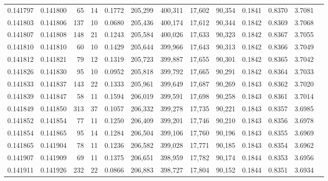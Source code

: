 \begin{tabular}{rrrrrrrrrrrrr}
0.141797 & 0.141800 &    65 &  14 &                                     0.1772 & 205,299 & 400,311 &  17,602 &  90,354 & 0.1841 & 0.8370 & 3.7081 \\
0.141803 & 0.141806 &   137 &  10 &                                     0.0680 & 205,436 & 400,174 &  17,612 &  90,344 & 0.1842 & 0.8369 & 3.7068 \\
0.141807 & 0.141808 &   148 &  21 &                                     0.1243 & 205,584 & 400,026 &  17,633 &  90,323 & 0.1842 & 0.8367 & 3.7055 \\
0.141810 & 0.141810 &    60 &  10 &                                     0.1429 & 205,644 & 399,966 &  17,643 &  90,313 & 0.1842 & 0.8366 & 3.7049 \\
0.141812 & 0.141821 &    79 &  12 &                                     0.1319 & 205,723 & 399,887 &  17,655 &  90,301 & 0.1842 & 0.8365 & 3.7042 \\
0.141826 & 0.141830 &    95 &  10 &                                     0.0952 & 205,818 & 399,792 &  17,665 &  90,291 & 0.1842 & 0.8364 & 3.7033 \\
0.141833 & 0.141837 &   143 &  22 &                                     0.1333 & 205,961 & 399,649 &  17,687 &  90,269 & 0.1843 & 0.8362 & 3.7020 \\
0.141839 & 0.141847 &    58 &  11 &                                     0.1594 & 206,019 & 399,591 &  17,698 &  90,258 & 0.1843 & 0.8361 & 3.7014 \\
0.141849 & 0.141850 &   313 &  37 &                                     0.1057 & 206,332 & 399,278 &  17,735 &  90,221 & 0.1843 & 0.8357 & 3.6985 \\
0.141852 & 0.141854 &    77 &  11 &                                     0.1250 & 206,409 & 399,201 &  17,746 &  90,210 & 0.1843 & 0.8356 & 3.6978 \\
0.141854 & 0.141865 &    95 &  14 &                                     0.1284 & 206,504 & 399,106 &  17,760 &  90,196 & 0.1843 & 0.8355 & 3.6969 \\
0.141865 & 0.141904 &    78 &  11 &                                     0.1236 & 206,582 & 399,028 &  17,771 &  90,185 & 0.1843 & 0.8354 & 3.6962 \\
0.141907 & 0.141909 &    69 &  11 &                                     0.1375 & 206,651 & 398,959 &  17,782 &  90,174 & 0.1844 & 0.8353 & 3.6956 \\
0.141911 & 0.141926 &   232 &  22 &                                     0.0866 & 206,883 & 398,727 &  17,804 &  90,152 & 0.1844 & 0.8351 & 3.6934 \\

\end{tabular}
